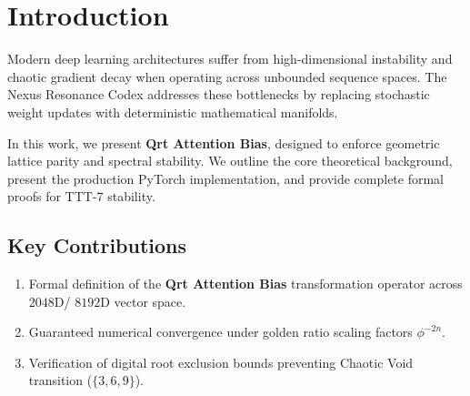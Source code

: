 \section{Introduction}
Modern deep learning architectures suffer from high-dimensional instability and chaotic gradient decay when operating across unbounded sequence spaces. The Nexus Resonance Codex addresses these bottlenecks by replacing stochastic weight updates with deterministic mathematical manifolds.

In this work, we present \textbf{Qrt Attention Bias}, designed to enforce geometric lattice parity and spectral stability. We outline the core theoretical background, present the production PyTorch implementation, and provide complete formal proofs for TTT-7 stability.

\subsection{Key Contributions}
\begin{enumerate}[label=\textbf{\arabic*.}]
    \item Formal definition of the \textbf{Qrt Attention Bias} transformation operator across $2048$D/ $8192$D vector space.
    \item Guaranteed numerical convergence under golden ratio scaling factors $\phi^{-2n}$.
    \item Verification of digital root exclusion bounds preventing Chaotic Void transition ($\{3, 6, 9\}$).
\end{enumerate}